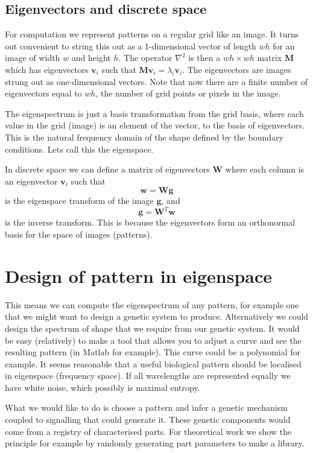 \documentclass{article}
\renewcommand{\vec}[1]{\mathbf{#1}}
\newcommand{\mat}{\mathbf}
\begin{document}
\subsection{Eigenvectors and discrete space}
For computation we represent patterns on a regular grid like an image. It turns
out convenient to string this out as a 1-dimensional vector of length $wh$
for an image of width $w$ and height $h$. The operator $\nabla^2$ is then a
$wh \times wh$ matrix $\mat{M}$ which has eigenvectors $\vec{v}_i$ such that $\mat{M}\vec{v}_i
= \lambda_i \vec{v}_i$. The eigenvectors are images strung out as
one-dimensional vectors. Note that now there are a finite number of eigenvectors
equal to $wh$, the number of grid points or pixels in the image.

The eigenspectrum is just a basis transformation from the grid basis, where each
value in the grid (image) is an element of the vector, to the basis of
eigenvectors. This is the natural frequency domain of the shape defined by the
boundary conditions. Lets call this the eigenspace.

In discrete space we can define a matrix of eigenvectors
$\mat{W}$ where each column is an eigenvector $\vec{v}_i$ such that
\begin{equation}
\vec{w} = \mat{W}\vec{g}
\end{equation}
is the eigenspace transform of the image $\vec{g}$, and
\begin{equation}
\vec{g} = \mat{W}^T\vec{w}
\end{equation}
is the inverse transform. This is because the eigenvectors form an orthonormal
basis for the space of images (patterns).

\section{Design of pattern in eigenspace}
This means we can compute the eigenspectrum of any pattern, for example one that
we might want to design a genetic system to produce. Alternatively we could
design the spectrum of shape that we require from our genetic system. It would
be easy (relatively) to make a tool that allows you to adjust a curve and see
the resulting pattern (in Matlab for example). This curve could be a polynomial
for example. It seems reasonable that a useful biological pattern should be
localised in eigenspace (frequency space). If all wavelengths are represented
equally we have white noise, which possibly is maximal entropy. 

What we would like to do is choose a pattern and infer a genetic mechanism
coupled to signalling that could generate it. These genetic components would
come from a registry of characterised parts. For theoretical work we show the
principle for example by randomly generating part parameters to make a library.
\end{document}
